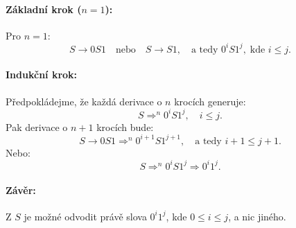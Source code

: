 \paragraph{Základní krok (\(n = 1\)):}
Pro \(n = 1\):
\[
S \rightarrow 0 S 1 \quad \text{nebo} \quad S \rightarrow S 1, \quad \text{a tedy } 0^i S 1^j, \; \text{kde } i \leq j.
\]

\paragraph{Indukční krok:}
Předpokládejme, že každá derivace o \(n\) krocích generuje:
\[
S \Rightarrow^n 0^i S 1^j, \quad i \leq j.
\]
Pak derivace o \(n+1\) krocích bude:
\[
S \rightarrow 0 S 1 \Rightarrow^n 0^{i+1} S 1^{j+1}, \quad \text{a tedy } i+1 \leq j+1.
\]
Nebo:
\[
S \Rightarrow^n 0^i S 1^j \Rightarrow 0^i 1^j.
\]

\paragraph{Závěr:}
Z \(S\) je možné odvodit právě slova \(0^i 1^j\), kde \(0 \leq i \leq j\), a nic jiného.
